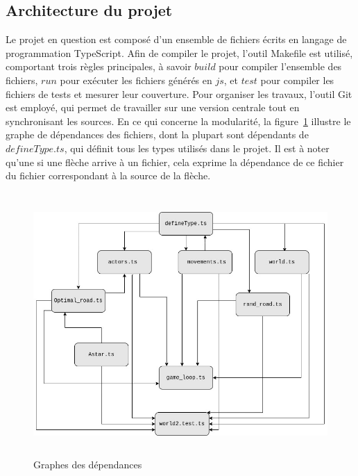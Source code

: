 \documentclass[11pt]{article}
\begin{document}
        \subsection{Architecture du projet}
           Le projet en question est composé d'un ensemble de fichiers écrits en langage de programmation TypeScript. Afin de compiler le projet, l'outil Makefile est utilisé, comportant trois règles principales, à savoir $build$ pour compiler l'ensemble des fichiers, $run$ pour exécuter les fichiers générés en $js$, et $test$ pour compiler les fichiers de tests et mesurer leur couverture. Pour organiser les travaux, l'outil Git est employé, qui permet de travailler sur une version centrale tout en synchronisant les sources. En ce qui concerne la modularité, la figure~\ref{fig:diagramme} illustre le graphe de dépendances des fichiers, dont la plupart sont dépendants de $defineType.ts$, qui définit tous les types utilisés dans le projet. Il est à noter qu'une si une flèche arrive à un fichier, cela exprime la dépendance de ce fichier du fichier correspondant à la source de la flèche.
              \begin{figure}[h]
                \centering
                \includegraphics[height = 10cm, width = 15cm]{Diagramme sans nom.jpg}
                \caption{Graphes des dépendances}
                \label{fig:diagramme}
            \end{figure}
\end{document}
